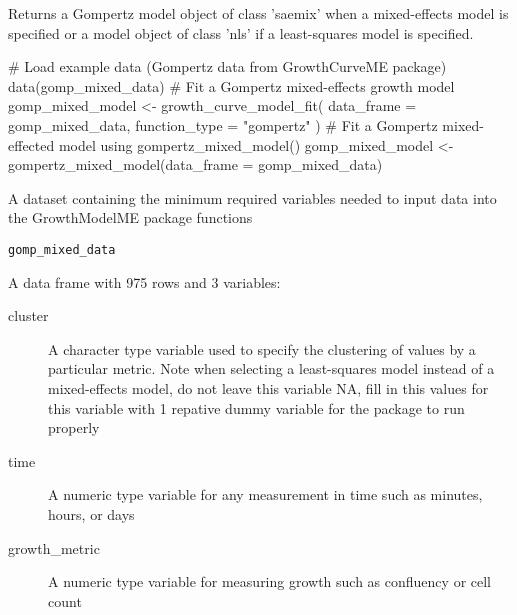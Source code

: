 \documentclass[a4paper]{book}
\begin{document}
%
\begin{Value}
Returns a Gompertz model object of class 'saemix' when a
mixed-effects model is specified or a model object of class 'nls' if a
least-squares model is specified.
\end{Value}
%
\begin{SeeAlso}
\end{SeeAlso}
%
\begin{Examples}
\begin{ExampleCode}
# Load example data (Gompertz data from GrowthCurveME package)
data(gomp_mixed_data)
# Fit a Gompertz mixed-effects growth model
gomp_mixed_model <- growth_curve_model_fit(
  data_frame = gomp_mixed_data,
  function_type = "gompertz"
)
# Fit a Gompertz mixed-effected model using gompertz_mixed_model()
gomp_mixed_model <- gompertz_mixed_model(data_frame = gomp_mixed_data)
\end{ExampleCode}
\end{Examples}
%
\begin{Description}
A dataset containing the minimum required variables needed to input data
into the GrowthModelME package functions
\end{Description}
%
\begin{Usage}
\begin{verbatim}
gomp_mixed_data
\end{verbatim}
\end{Usage}
%
\begin{Format}
A data frame with 975 rows and 3 variables:
\begin{description}

\item[cluster] A character type variable used to specify the clustering
of values by a particular metric. Note when selecting a least-squares
model instead of a mixed-effects model, do not leave this variable NA,
fill in this values for this variable with 1 repative dummy variable for
the package to run properly
\item[time] A numeric type variable for any measurement in time such as
minutes, hours, or days
\item[growth\_metric] A numeric type variable for measuring growth such
as confluency or cell count

\end{description}

\end{Format}
\end{document}
